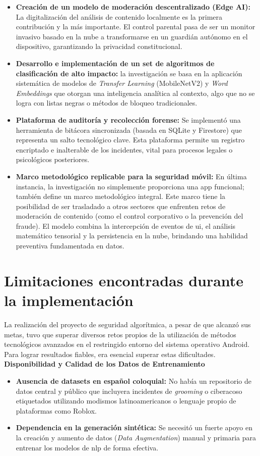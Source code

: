 \begin{itemize}
    \item \textbf{Creación de un modelo de moderación descentralizado (Edge AI):} La digitalización del análisis de contenido localmente es la primera contribución y la más importante. El control parental pasa de ser un monitor invasivo basado en la nube a transformarse en un guardián autónomo en el dispositivo, garantizando la privacidad constitucional.
    \item \textbf{Desarrollo e implementación de un set de algoritmos de clasificación de alto impacto:} la investigación se basa en la aplicación sistemática de modelos de \textit{Transfer Learning} (MobileNetV2) y \textit{Word Embeddings} que otorgan una inteligencia analítica al contexto, algo que no se logra con listas negras o métodos de bloqueo tradicionales.
    \item \textbf{Plataforma de auditoría y recolección forense:} Se implementó una herramienta de bitácora sincronizada (basada en SQLite y Firestore) que representa un salto tecnológico clave. Esta plataforma permite un registro encriptado e inalterable de los incidentes, vital para procesos legales o psicológicos posteriores.
    \item \textbf{Marco metodológico replicable para la seguridad móvil:} En última instancia, la investigación no simplemente proporciona una app funcional; también define un marco metodológico integral. Este marco tiene la posibilidad de ser trasladado a otros sectores que enfrenten retos de moderación de contenido (como el control corporativo o la prevención del fraude). El modelo combina la intercepción de eventos de \gls{ui}, el análisis matemático tensorial y la persistencia en la nube, brindando una habilidad preventiva fundamentada en datos.
\end{itemize}

\section{Limitaciones encontradas durante la implementación}
La realización del proyecto de seguridad algorítmica, a pesar de que alcanzó sus metas, tuvo que superar diversos retos propios de la utilización de métodos tecnológicos avanzados en el restringido entorno del sistema operativo Android. Para lograr resultados fiables, era esencial superar estas dificultades. \\

\textbf{Disponibilidad y Calidad de los Datos de Entrenamiento} \\
\begin{itemize}
    \item \textbf{Ausencia de datasets en español coloquial:} No había un repositorio de datos central y público que incluyera incidentes de \textit{grooming} o ciberacoso etiquetados utilizando modismos latinoamericanos o lenguaje propio de plataformas como Roblox.
    \item \textbf{Dependencia en la generación sintética:} Se necesitó un fuerte apoyo en la creación y aumento de datos (\textit{Data Augmentation}) manual y primaria para entrenar los modelos de \gls{nlp} de forma efectiva.
\end{itemize}


